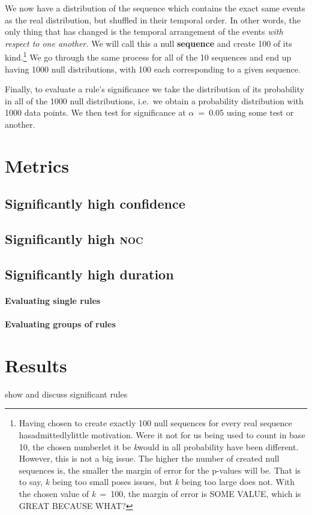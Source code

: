 We now have a distribution of the sequence which contains the exact same events as the real distribution, but shuffled in their temporal order.
In other words, the only thing that has changed is the temporal arrangement of the events \emph{with respect to one another.} We will call this a null \textbf{sequence} and create 100 of its kind.\footnote{Having chosen to create exactly 100 null sequences for every real sequence has\dash admittedly\dash little motivation.
Were it not for us being used to count in base 10, the chosen number\dash let it be \textit{k}\dash would in all probability have been different.
However, this is not a big issue.
The higher the number of created null sequences is, the smaller the margin of error for the p-values will be.
That is to say, \textit{k} being too small poses issues, but \textit{k} being too large does not.
With the chosen value of \textit{k}~=~100, the margin of error is SOME VALUE, which is GREAT BECAUSE WHAT?}
We go through the same process for all of the 10 sequences and end up having 1000 null distributions, with 100 each corresponding to a given sequence.

Finally, to evaluate a rule's significance we take the distribution of its probability in all of the 1000 null distributions, i.e.~we obtain a probability distribution with 1000 data points.
We then test for significance at \(\alpha\)~=~0.05 using some test or another.

%
%

\section{Metrics}
\label{sec:sigmet}

\subsection{Significantly high confidence}
\subsection{Significantly high \textsc{noc}}
\subsection{Significantly high duration}
\paragraph{Evaluating single rules}
\paragraph{Evaluating groups of rules}
\section{Results}
\label{sec:sigres}
show and discuss significant rules




